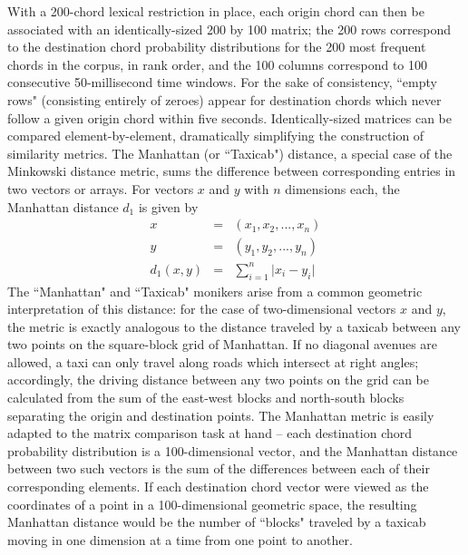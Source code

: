 With a 200-chord lexical restriction in place, each origin chord can then be associated with an identically-sized 200 by 100 matrix; the 200 rows correspond to the destination chord probability distributions for the 200 most frequent chords in the corpus, in rank order, and the 100 columns correspond to 100 consecutive 50-millisecond time windows.  For the sake of consistency, ``empty rows" (consisting entirely of zeroes) appear for destination chords which never follow a given origin chord within five seconds.  Identically-sized matrices can be compared element-by-element, dramatically simplifying the construction of similarity metrics.  The Manhattan (or ``Taxicab") distance, a special case of the Minkowski distance metric, sums the difference between corresponding entries in two vectors or arrays.  For vectors $x$ and $y$ with $n$ dimensions each, the Manhattan distance $d_1$ is given by
\begin{eqnarray*}
x &=& (x_1,x_2,...,x_n) \\
y &=& (y_1,y_2,...,y_n) \\
d_1(x,y) &=& \sum_{i=1}^n \lvert x_i - y_i \rvert
\end{eqnarray*}
The ``Manhattan" and ``Taxicab" monikers arise from a common geometric interpretation of this distance: for the case of two-dimensional vectors $x$ and $y$, the metric is exactly analogous to the distance traveled by a taxicab between any two points on the square-block grid of Manhattan.  If no diagonal avenues are allowed, a taxi can only travel along roads which intersect at right angles; accordingly, the driving distance between any two points on the grid can be calculated from the sum of the east-west blocks and north-south blocks separating the origin and destination points.  The Manhattan metric is easily adapted to the matrix comparison task at hand -- each destination chord probability distribution is a 100-dimensional vector, and the Manhattan distance between two such vectors is the sum of the differences between each of their corresponding elements.  If each destination chord vector were viewed as the coordinates of a point in a 100-dimensional geometric space, the resulting Manhattan distance would be the number of ``blocks" traveled by a taxicab moving in one dimension at a time from one point to another.

